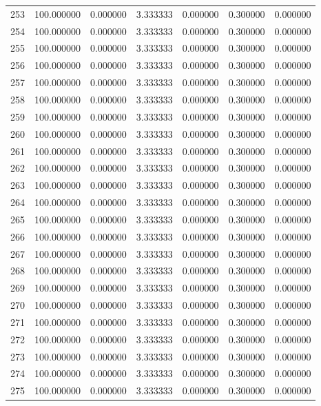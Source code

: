 \begin{tabular}{rrrrrrr}
253 & 100.000000 &    0.000000 &  3.333333 &   0.000000 &   0.300000 &  0.000000 \\
254 & 100.000000 &    0.000000 &  3.333333 &   0.000000 &   0.300000 &  0.000000 \\
255 & 100.000000 &    0.000000 &  3.333333 &   0.000000 &   0.300000 &  0.000000 \\
256 & 100.000000 &    0.000000 &  3.333333 &   0.000000 &   0.300000 &  0.000000 \\
257 & 100.000000 &    0.000000 &  3.333333 &   0.000000 &   0.300000 &  0.000000 \\
258 & 100.000000 &    0.000000 &  3.333333 &   0.000000 &   0.300000 &  0.000000 \\
259 & 100.000000 &    0.000000 &  3.333333 &   0.000000 &   0.300000 &  0.000000 \\
260 & 100.000000 &    0.000000 &  3.333333 &   0.000000 &   0.300000 &  0.000000 \\
261 & 100.000000 &    0.000000 &  3.333333 &   0.000000 &   0.300000 &  0.000000 \\
262 & 100.000000 &    0.000000 &  3.333333 &   0.000000 &   0.300000 &  0.000000 \\
263 & 100.000000 &    0.000000 &  3.333333 &   0.000000 &   0.300000 &  0.000000 \\
264 & 100.000000 &    0.000000 &  3.333333 &   0.000000 &   0.300000 &  0.000000 \\
265 & 100.000000 &    0.000000 &  3.333333 &   0.000000 &   0.300000 &  0.000000 \\
266 & 100.000000 &    0.000000 &  3.333333 &   0.000000 &   0.300000 &  0.000000 \\
267 & 100.000000 &    0.000000 &  3.333333 &   0.000000 &   0.300000 &  0.000000 \\
268 & 100.000000 &    0.000000 &  3.333333 &   0.000000 &   0.300000 &  0.000000 \\
269 & 100.000000 &    0.000000 &  3.333333 &   0.000000 &   0.300000 &  0.000000 \\
270 & 100.000000 &    0.000000 &  3.333333 &   0.000000 &   0.300000 &  0.000000 \\
271 & 100.000000 &    0.000000 &  3.333333 &   0.000000 &   0.300000 &  0.000000 \\
272 & 100.000000 &    0.000000 &  3.333333 &   0.000000 &   0.300000 &  0.000000 \\
273 & 100.000000 &    0.000000 &  3.333333 &   0.000000 &   0.300000 &  0.000000 \\
274 & 100.000000 &    0.000000 &  3.333333 &   0.000000 &   0.300000 &  0.000000 \\
275 & 100.000000 &    0.000000 &  3.333333 &   0.000000 &   0.300000 &  0.000000 \\
\bottomrule
\end{tabular}
